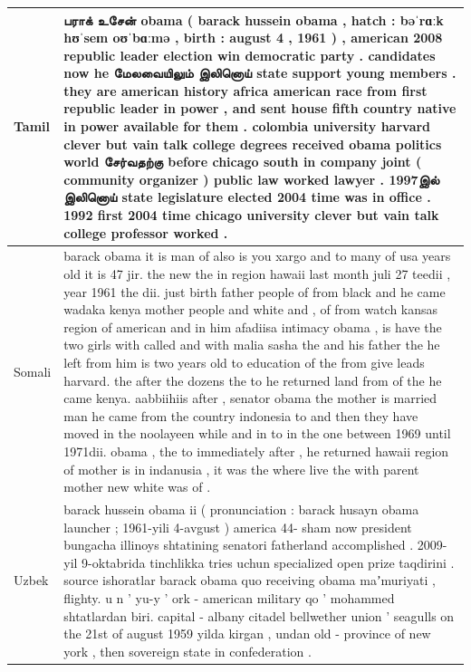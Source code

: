 \documentclass[11pt]{article}
\begin{document}
\begin{center}
\begin{longtable}{|p{1.5cm}|p{13cm}|}
\hline
Tamil & {பராக் உசேன் obama ( barack hussein obama , hatch : bəˈrɑːk hʊˈseɪn oʊˈbɑːmə , birth : august 4 , 1961 ) , american 2008 republic leader election win democratic party . candidates now he மேலவையிலும் இலினொய் state support young members . they are american history africa american race from first republic leader in power , and sent house fifth country native in power available for them . colombia university harvard clever but vain talk college degrees received obama politics world சேர்வதற்கு before chicago south in company joint ( community organizer ) public law worked lawyer . 1997இல் இலினொய் state legislature elected 2004 time was in office . 1992 first 2004 time chicago university clever but vain talk college professor worked .}\\
\hline
Somali & {barack obama it is man of also is you xargo and to many of usa years old it is 47 jir. the new the in region hawaii last month juli 27 teedii , year 1961 the dii. just birth father people of from black and he came wadaka kenya mother people and white and , of from watch kansas region of american and in him afadiisa intimacy obama , is have the two girls with called and with malia sasha the and his father the he left from him is two years old to education of the from give leads harvard. the after the dozens the to he returned land from of the he came kenya. aabbiihiis after , senator obama the mother is married man he came from the country indonesia to and then they have moved in the noolayeen while and in to in the one between 1969 until 1971dii. obama , the to immediately after , he returned hawaii region of mother is in indanusia , it was the where live the with parent mother new white was of .}\\
\hline
Uzbek & {barack hussein obama ii ( pronunciation : barack husayn obama launcher ; 1961-yili 4-avgust ) america 44- sham now president bungacha illinoys shtatining senatori fatherland accomplished .  2009-yil 9-oktabrida tinchlikka tries uchun specialized open prize taqdirini . source  ishoratlar  barack obama quo receiving obama maʼmuriyati , flighty. u n ' yu-y ' ork - american military qo ' mohammed shtatlardan biri. capital - albany citadel bellwether union ' seagulls on the 21st of august 1959 yilda kirgan , undan old - province of new york , then sovereign state in confederation .} \\
\hline

\end{longtable}
\end{center}
\end{document}
